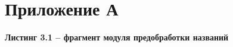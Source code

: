 \chapter*{Приложение А}\label{ux43fux440ux438ux43bux43eux436ux435ux43dux438ux435-ux430}

\textbf{Листинг 3.1 -- фрагмент модуля предобработки названий}


